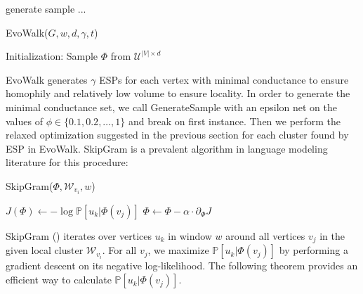 \documentclass{article}
\begin{document}
generate sample ...

\begin{algorithm}
  \caption{EvoWalk(\(G, w, d, \gamma, t\))}
  Initialization: Sample $\Phi$ from $\mathcal{U}^{|V|\times d}$\\
\end{algorithm}

EvoWalk generates \(\gamma\) ESPs for each vertex with minimal conductance to ensure homophily and relatively low volume to ensure
locality. In order to generate the minimal conductance set, we call GenerateSample with an epsilon net on the
values of \(\phi\in \{0.1, 0.2, \ldots, 1\}\) and break on first instance. Then we perform the relaxed optimization suggested in the previous section for each cluster found
by ESP in EvoWalk. SkipGram is a prevalent algorithm in language modeling literature for this procedure:
\begin{algorithm}
  \caption{SkipGram(\(\Phi, \mathcal{W}_{v_i}, w\))}
   {
     {
      $J(\Phi)\leftarrow -\log \mathbb{P}[u_k|\Phi(v_j)]$   
      $\Phi\leftarrow \Phi -\alpha \cdot \partial_{\Phi} J$  
    }
  }
\end{algorithm}

SkipGram (\citet{mikolov2013efficient}) iterates over vertices \(u_k\) in window \(w\) around all vertices \(v_j\) in the
given local cluster \(\mathcal{W}_{v_i}\). For all \(v_j\), we maximize \(\mathbb{P}[u_k|\Phi(v_j)]\)
by performing a gradient descent on its negative log-likelihood. The following theorem provides
an efficient way to calculate \(\mathbb{P}[u_k|\Phi(v_j)]\).
\end{document}
